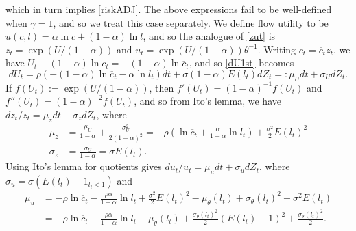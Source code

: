\documentclass[11pt]{article}
\theoremstyle{plain}
\begin{document}
which in turn implies \eqref{riskADJ}. The above expressions fail to be well-defined when $\gamma=1$, and so we treat this case separately. We define flow utility to be $u(c,l) = \alpha \ln c + (1-\alpha) \ln l$, and so the analogue of \eqref{zut} is $z_t = \exp(U/(1-\alpha))$ and $u_t = \exp(U/(1-\alpha))\theta^{-1}$. Writing $c_t = \overline{c}_tz_t$, we have $U_t - (1 - \alpha) \ln c_t = - (1 - \alpha) \ln \overline{c}_t$, and so \eqref{dU1st} becomes 
$$
dU_t = \rho{\left(- (1 - \alpha) \ln \overline{c}_t - \alpha \ln l_t\right)}dt + \sigma (1-\alpha)E(l_t) dZ_t =: \mu_Udt + \sigma_UdZ_t.
$$ 
If $f(U_t) := \exp(U/(1-\alpha))$, then $f'(U_t) = (1-\alpha)^{-1}f(U_t)$ and $f''(U_t) = (1-\alpha)^{-2}f(U_t)$, and so from Ito's lemma, we have $dz_t/z_t = \mu_zdt + \sigma_zdZ_t$, where
\begin{equation}
\begin{aligned}
\mu_z & = \frac{\mu_U}{1-\alpha} + \frac{\sigma_U^2}{2(1-\alpha)^2} =-\rho{\left(\ln \overline{c}_t + \frac{\alpha}{1-\alpha} \ln l_t\right)} + \frac{\sigma^2}{2} E(l_t)^2
\\ \sigma_z & = \frac{\sigma_U}{1-\alpha} = \sigma E(l_t).
\end{aligned} %
\label{zlawLOG} 
\end{equation}
Using Ito's lemma for quotients gives $du_t/u_t = \mu_udt + \sigma_udZ_t$, where $\sigma_u = \sigma (E(l_t) - 1_{l_t<1})$ and
\begin{equation}
\begin{aligned} %
\mu_u & = -\rho \ln \overline{c}_t - \frac{\rho\alpha}{1-\alpha} \ln l_t + \frac{\sigma^2}{2} E(l_t)^2 - \mu_{\theta}(l_t) + \sigma_{\theta}(l_t)^2 - \sigma^2E(l_t) 
\\ & = -\rho \ln \overline{c}_t - \frac{\rho\alpha}{1-\alpha} \ln l_t - \mu_{\theta}(l_t) + \frac{\sigma_{\theta}(l_t)^2}{2}(E(l_t) - 1)^2 + \frac{\sigma_{\theta}(l_t)^2}{2}.
\end{aligned}
\label{normlawLOG}
\end{equation}
\end{document}
